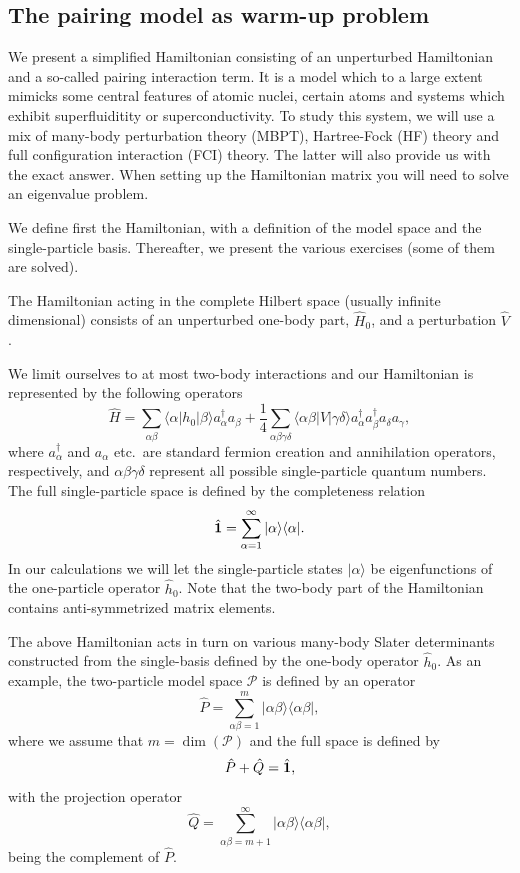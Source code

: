 \documentclass[%
twoside,                 %
final,                   %
10pt]{article}
\begin{document}
\noindent
\subsection*{The pairing model as warm-up problem}

We present a simplified Hamiltonian consisting of an unperturbed
Hamiltonian and a so-called pairing interaction term. It is a model
which to a large extent mimicks some central features of atomic
nuclei, certain atoms and systems which exhibit superfluiditity or
superconductivity.  To study this system, we will use a mix of
many-body perturbation theory (MBPT), Hartree-Fock (HF) theory and full
configuration interaction (FCI) theory. The latter will also provide us with
the exact answer.  When setting up the Hamiltonian matrix you will
need to solve an eigenvalue problem.

We define first the Hamiltonian, with a definition of the model space
and the single-particle basis. Thereafter, we present the various
exercises (some of them are solved).


The Hamiltonian acting in the complete Hilbert space (usually infinite
dimensional) consists of an unperturbed one-body part, $\hat{H}_0$,
and a perturbation $\hat{V}$.

We limit ourselves to at most two-body interactions and our Hamiltonian
is represented by the following operators
\[
\hat{H} = \sum_{\alpha\beta}\langle \alpha |h_0|\beta\rangle
a_{\alpha}^{\dagger}a_{\beta}+\frac{1}{4}\sum_{\alpha\beta\gamma\delta}\langle \alpha\beta|
V|\gamma\delta\rangle a_{\alpha}^{\dagger}a_{\beta}^{\dagger}a_{\delta}a_{\gamma},
\]
where $a_{\alpha}^{\dagger}$ and $a_{\alpha}$ etc.~are standard
fermion creation and annihilation operators, respectively, and
$\alpha\beta\gamma\delta$ represent all possible single-particle
quantum numbers.  The full single-particle space is defined by the
completeness relation 
\[
\hat{{\bf 1}} = \sum_{\alpha=1}^{\infty}|\alpha \rangle \langle \alpha|.
\]
In our calculations
we will let the single-particle states $|\alpha\rangle$ be
eigenfunctions of the one-particle operator $\hat{h}_0$. Note that the two-body part of the Hamiltonian 
contains anti-symmetrized matrix elements.


The above Hamiltonian acts in turn on various many-body Slater
determinants constructed from the single-basis defined by the one-body
operator $\hat{h}_0$.  As an example, the two-particle model space
$\mathcal{P}$ is defined by an operator
\[
\hat{P} = \sum_{\alpha\beta =1}^{m}|\alpha\beta \rangle \langle
\alpha\beta|,
\]
where we assume that $m=\dim(\mathcal{P})$ and the full space is
defined by
\[
\hat{P}+\hat{Q}=\hat{{\bf 1}},
\]
with the projection operator
\[
\hat{Q} = \sum_{\alpha\beta =m+1}^{\infty}|\alpha\beta \rangle \langle
\alpha\beta|,
\]
being the complement of $\hat{P}$.
\end{document}
